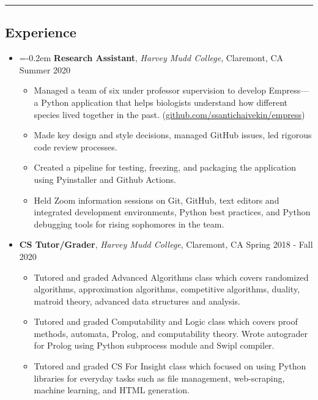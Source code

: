 \documentclass[10pt,letterpaper]{article}
\begin{document}
\hrule
\vspace{-0.95em}
\subsection*{Experience}
  \begin{itemize}
    \item[]
    \parskip=-0.2em
    {\textbf{Research Assistant}, \textit{Harvey Mudd College}, Claremont, CA \hfill {Summer 2020}}
    \begin{itemize}[label=\textbullet]
      \itemsep0.1em
      \item Managed a team of six under professor supervision to develop Empress---a Python application that helps biologists understand how different species lived together in the past. (\href{https://github.com/ssantichaivekin/empress}{github.com/ssantichaivekin/empress})
      \item Made key design and style decisions, managed GitHub issues, led rigorous code review processes.
      \item Created a pipeline for testing, freezing, and packaging the application using Pyinstaller and Github Actions.
      \item Held Zoom information sessions on Git, GitHub, text editors and integrated development environments, Python best practices, and Python debugging tools for rising sophomores in the team.
    \end{itemize}
    \vspace{0.1em}
    \item[]
    {\textbf{CS Tutor/Grader}, \textit{Harvey Mudd College}, Claremont, CA \hfill {Spring 2018 - Fall 2020}}
    \begin{itemize}[label=\textbullet]
      \itemsep0.1em
      \item Tutored and graded Advanced Algorithms class which covers randomized algorithms, approximation algorithms, competitive algorithms, duality, matroid theory, advanced data structures and analysis.
      \item Tutored and graded Computability and Logic class which covers proof methods, automata, Prolog, and computability theory. Wrote autograder for Prolog using Python subprocess module and Swipl compiler.
      \item Tutored and graded CS For Insight class which focused 
      on using Python libraries for everyday tasks such as file management, web-scraping, 
      machine learning, and HTML generation.
    \end{itemize}

\end{itemize}
\end{document}
